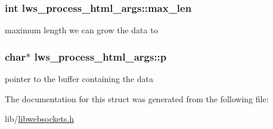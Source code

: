 \subsubsection[{\texorpdfstring{max\+\_\+len}{max\_len}}]{\setlength{\rightskip}{0pt plus 5cm}int lws\+\_\+process\+\_\+html\+\_\+args\+::max\+\_\+len}\hypertarget{structlws__process__html__args_a8be7fd396a1942ea2449a2fda990ff99}{}\label{structlws__process__html__args_a8be7fd396a1942ea2449a2fda990ff99}
maximum length we can grow the data to 
\subsubsection[{\texorpdfstring{p}{p}}]{\setlength{\rightskip}{0pt plus 5cm}char$\ast$ lws\+\_\+process\+\_\+html\+\_\+args\+::p}\hypertarget{structlws__process__html__args_a11859d8bedd379fbf64543b25c65fe14}{}\label{structlws__process__html__args_a11859d8bedd379fbf64543b25c65fe14}
pointer to the buffer containing the data 

The documentation for this struct was generated from the following file\+:\begin{DoxyCompactItemize}
\item 
lib/\hyperlink{libwebsockets_8h}{libwebsockets.\+h}\end{DoxyCompactItemize}
